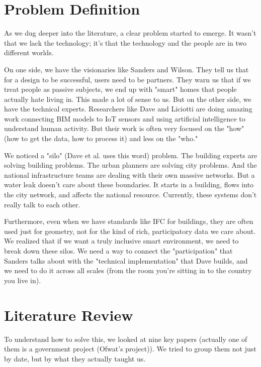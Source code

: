 \documentclass[a4paper,oneside,12pt]{report}
\begin{document}
\chapter{Problem Definition}

As we dug deeper into the literature, a clear problem started to emerge. It wasn't that we lack the technology; it's that the technology and the people are in two different worlds.

On one side, we have the visionaries like Sanders\cite{Sanders2008} and Wilson\cite{Wilson2015}. They tell us that for a design to be successful, users need to be partners. They warn us that if we treat people as passive subjects, we end up with "smart" homes that people actually hate living in. This made a lot of sense to us. But on the other side, we have the technical experts. Researchers like Dave\cite{Dave2018} and Liciotti\cite{Liciotti2020} are doing amazing work connecting BIM models to IoT sensors and using artificial intelligence to understand human activity. But their work is often very focused on the "how" (how to get the data, how to process it) and less on the "who."

We noticed a "silo" (Dave et al.\cite{Dave2018} uses this word) problem. The building experts are solving building problems. The urban planners are solving city problems. And the national infrastructure teams are dealing with their own massive networks. But a water leak doesn't care about these boundaries. It starts in a building, flows into the city network, and affects the national resource. Currently, these systems don't really talk to each other.

Furthermore, even when we have standards like IFC for buildings, they are often used just for geometry, not for the kind of rich, participatory data we care about. We realized that if we want a truly inclusive smart environment, we need to break down these silos. We need a way to connect the "participation" that Sanders talks about with the "technical implementation" that Dave builds, and we need to do it across all scales (from the room you're sitting in to the country you live in).

\chapter{Literature Review}

To understand how to solve this, we looked at nine key papers (actually one of them is a government project (Ofwat's project\cite{ThamesWater2024})). We tried to group them not just by date, but by what they actually taught us.
\end{document}
